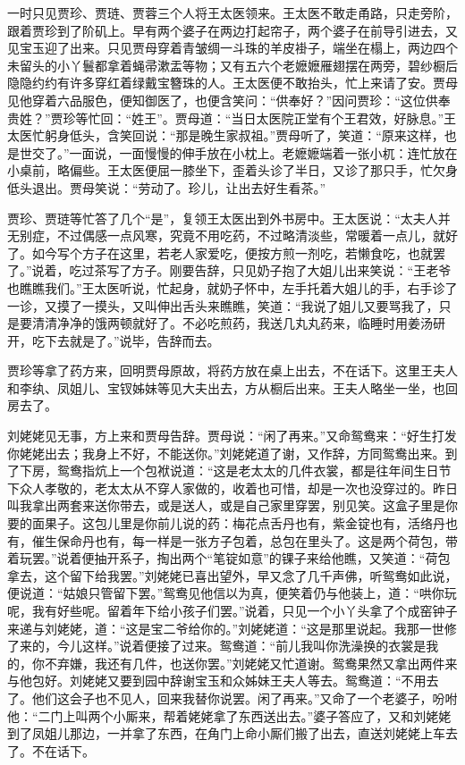 \documentclass[12pt,oneside]{book}
\begin{document}
一时只见贾珍、贾琏、贾蓉三个人将王太医领来。王太医不敢走甬路，只走旁阶，跟着贾珍到了阶矶上。早有两个婆子在两边打起帘子，两个婆子在前导引进去，又见宝玉迎了出来。只见贾母穿着青皱绸一斗珠的羊皮褂子，端坐在榻上，两边四个未留头的小丫鬟都拿着蝇帚漱盂等物；又有五六个老嬷嬷雁翅摆在两旁，碧纱橱后隐隐约约有许多穿红着绿戴宝簪珠的人。王太医便不敢抬头，忙上来请了安。贾母见他穿着六品服色，便知御医了，也便含笑问：“供奉好？”因问贾珍：“这位供奉贵姓？”贾珍等忙回：“姓王”。贾母道：“当日太医院正堂有个王君效，好脉息。”王太医忙躬身低头，含笑回说：“那是晚生家叔祖。”贾母听了，笑道：“原来这样，也是世交了。”一面说，一面慢慢的伸手放在小枕上。老嬷嬷端着一张小杌：连忙放在小桌前，略偏些。王太医便屈一膝坐下，歪着头诊了半日，又诊了那只手，忙欠身低头退出。贾母笑说：“劳动了。珍儿，让出去好生看茶。”

贾珍、贾琏等忙答了几个“是”，复领王太医出到外书房中。王太医说：“太夫人并无别症，不过偶感一点风寒，究竟不用吃药，不过略清淡些，常暖着一点儿，就好了。如今写个方子在这里，若老人家爱吃，便按方煎一剂吃，若懒食吃，也就罢了。”说着，吃过茶写了方子。刚要告辞，只见奶子抱了大姐儿出来笑说：“王老爷也瞧瞧我们。”王太医听说，忙起身，就奶子怀中，左手托着大姐儿的手，右手诊了一诊，又摸了一摸头，又叫伸出舌头来瞧瞧，笑道：“我说了姐儿又要骂我了，只是要清清净净的饿两顿就好了。不必吃煎药，我送几丸丸药来，临睡时用姜汤研开，吃下去就是了。”说毕，告辞而去。

贾珍等拿了药方来，回明贾母原故，将药方放在桌上出去，不在话下。这里王夫人和李纨、凤姐儿、宝钗姊妹等见大夫出去，方从橱后出来。王夫人略坐一坐，也回房去了。

刘姥姥见无事，方上来和贾母告辞。贾母说：“闲了再来。”又命鸳鸯来：“好生打发你姥姥出去；我身上不好，不能送你。”刘姥姥道了谢，又作辞，方同鸳鸯出来。到了下房，鸳鸯指炕上一个包袱说道：“这是老太太的几件衣裳，都是往年间生日节下众人孝敬的，老太太从不穿人家做的，收着也可惜，却是一次也没穿过的。昨日叫我拿出两套来送你带去，或是送人，或是自己家里穿罢，别见笑。这盒子里是你要的面果子。这包儿里是你前儿说的药：梅花点舌丹也有，紫金锭也有，活络丹也有，催生保命丹也有，每一样是一张方子包着，总包在里头了。这是两个荷包，带着玩罢。”说着便抽开系子，掏出两个“笔锭如意”的锞子来给他瞧，又笑道：“荷包拿去，这个留下给我罢。”刘姥姥已喜出望外，早又念了几千声佛，听鸳鸯如此说，便说道：“姑娘只管留下罢。”鸳鸯见他信以为真，便笑着仍与他装上，道：“哄你玩呢，我有好些呢。留着年下给小孩子们罢。”说着，只见一个小丫头拿了个成窑钟子来递与刘姥姥，道：“这是宝二爷给你的。”刘姥姥道：“这是那里说起。我那一世修了来的，今儿这样。”说着便接了过来。鸳鸯道：“前儿我叫你洗澡换的衣裳是我的，你不弃嫌，我还有几件，也送你罢。”刘姥姥又忙道谢。鸳鸯果然又拿出两件来与他包好。刘姥姥又要到园中辞谢宝玉和众姊妹王夫人等去。鸳鸯道：“不用去了。他们这会子也不见人，回来我替你说罢。闲了再来。”又命了一个老婆子，吩咐他：“二门上叫两个小厮来，帮着姥姥拿了东西送出去。”婆子答应了，又和刘姥姥到了凤姐儿那边，一并拿了东西，在角门上命小厮们搬了出去，直送刘姥姥上车去了。不在话下。
\end{document}
